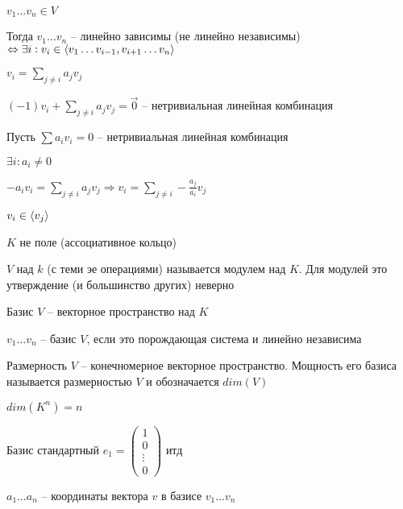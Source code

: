 \documentclass[12pt]{article}
\begin{document}
\begin{propos}{}
    $v_1 \ldots v_n \in V$

    Тогда $v_1 \ldots v_n$ -- линейно зависимы (не линейно независимы) $\Leftrightarrow \exists i : v_i \in \langle v_1 \ldots v_{i - 1}, v_{i + 1} \ldots v_n \rangle$

    $v_i = \sum\limits_{j \neq i} a_jv_j$

    $(-1)v_i + \sum\limits_{j \neq i} a_jv_j = \overrightarrow{0}$ -- нетривиальная линейная комбинация 

    \vspace{2mm}

    Пусть $\sum a_iv_i = 0$ -- нетривиальная линейная комбинация

    $\exists i : a_i \neq 0$

    $-a_iv_i = \sum\limits_{j \neq i} a_jv_j \Rightarrow v_i = \sum\limits_{j \neq i} -\frac{a_j}{a_i}v_j$

$v_i \in \langle v_j \rangle$
\end{propos}

\begin{Remark}{}
    $K$ не поле (ассоциативное кольцо)

    $V$ над $k$ (с теми эе операциями) называется модулем над $K$. Для модулей это утверждение (и большинство других) неверно
\end{Remark}

\begin{defin}{Базис}
    $V$ -- векторное пространство над $K$

    $v_1 \ldots v_n$ -- базис $V$, если это порождающая система и линейно независима
\end{defin}

\begin{defin}{Размерность}
    $V$ -- конечномерное векторное пространство. Мощность его базиса называется размерностью $V$ и обозначается $dim(V)$
\end{defin}

\begin{Example}{}
    $dim(K^n) = n$

    Базис стандартный $e_1 = \left( \begin{gathered}
        1 \\
        0 \\
        \vdots \\
        0
    \end{gathered} \right)$ итд
\end{Example}

\begin{defin}{}
    $a_1 \ldots a_n$ -- координаты вектора $v$ в базисе $v_1 \ldots v_n$
\end{defin}
\end{document}
